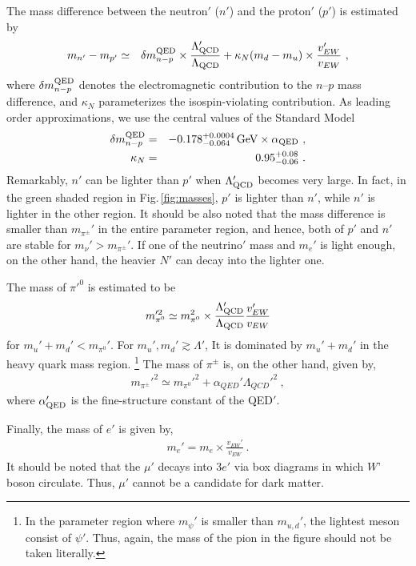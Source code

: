 \documentclass[aps,amsmath,preprint,epsf,superscriptaddress,nofootinbib,notitlepage]{revtex4-1}
\begin{document}
The mass difference between the neutron$'$ ($n'$)  and the proton$'$ ($p'$) is estimated by
\begin{eqnarray}
m_{n'} - m_{p'} &\simeq& \delta m_{n-p}^{\rm QED}  \times \frac{\Lambda_{\rm QCD}'}{\Lambda_{\rm QCD}} 
+ \kappa_N (m_d-m_u)\times \frac{v_{EW}'} {v_{EW}}\ , 
\end{eqnarray}
where $ \delta m_{n-p}^{\rm QED}$ denotes the electromagnetic contribution to the $n$--$p$ mass difference,
and $\kappa_N$  parameterizes the isospin-violating contribution.
As leading order approximations, we use the central values of the Standard Model~\cite{Walker-Loud:2014iea}
\begin{eqnarray}
\delta m_{n-p}^{\rm QED} &=& - 0.178^{+0.0004}_{-0.064}\,{\rm GeV}  \times \alpha_{\rm QED} \ ,\\
\kappa_N &=& 0.95^{+0.08}_{-0.06} \ .
\end{eqnarray}
Remarkably, $n'$ can be lighter than  $p'$ when $\Lambda_{\rm QCD}'$ becomes very large.
In fact, in the green shaded region in Fig.\,\ref{fig:masses}, $p'$ is lighter than $n'$, while $n'$ is lighter in the other region.
It should be also noted that the mass difference is smaller than $m_{\pi^\pm}'$ in the entire parameter region,
and hence, both of $p'$ and  $n'$ are stable for $m_\nu' > m_{\pi^\pm}'$. 
If one of the neutrino$'$ mass and $m_e'$ is light enough, on the other hand, the heavier $N'$  
can decay into the lighter one.

The mass of $\pi'^0$ is estimated to be
\begin{eqnarray}
\label{eq:pi0}
m_{\pi^0}'^2 \simeq m_{\pi^0}^2 \times \frac{\Lambda_{\rm QCD}'}{\Lambda_{\rm QCD}} \frac{v_{EW}'} {v_{EW}} 
\end{eqnarray}
for $m_u'+m_d'  < m_{\pi^0}'$.
For $m_u', m_d' \gtrsim \Lambda'$, 
It is dominated by $m_u' + m_d'$ in the heavy quark mass region.%
\footnote{In the parameter region where $m_\psi'$ is smaller than $m_{u,d}'$, the lightest meson 
consist of $\psi'$. Thus, again, the mass of the pion in the figure should not be taken literally.}
The mass of $\pi^\pm$ is, on the other hand, given by,
\begin{eqnarray}
\label{eq:pi0}
m_{\pi^\pm}'^2 \simeq m_{\pi^0}'^2 + \alpha_{ QED}' \Lambda_{ QCD}'^2\ ,
\end{eqnarray}
where $\alpha_{\rm QED}'$  is the fine-structure constant of the QED$'$.

Finally, the mass of $e'$ is given by,
\begin{eqnarray}
m_e' = m_e \times  \frac{v_{EW}'} {v_{EW}}\ .
\end{eqnarray}
It should be noted that the $\mu'$ decays into $3e'$ via box diagrams in which $W$' boson circulate.
Thus, $\mu'$ cannot be a candidate for dark matter.
\end{document}

